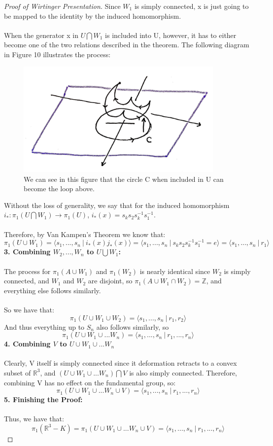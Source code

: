 \documentclass{article}
\begin{document}
\begin{proof}[Proof of Wirtinger Presentation]
Since $W_1$ is simply connected, x is just going to be mapped to the identity by the induced homomorphism.\\\\
When the generator x in $U \bigcap W_1$ is included into U, however, it has to either become one of the two relations described in the theorem. The following diagram in Figure 10 illustrates the process:
	\begin{figure}[h!]
		\centering
		\captionsetup{width=.75\linewidth}
		\includegraphics[width=4in]{figures/loop_above_plane.png}
		\caption{We can see in this figure that the circle C when included in U can become the loop above.}
		\label{fig:rtinstability}
	\end{figure}
Without the loss of generality, we say that for the induced homomorphism $i_*: \pi_1(U \bigcap W_1) \to \pi_1(U)$, $i_*(x) = s_ks_2s_k^{-1}s_1^{-1}$.\\\\
Therefore, by Van Kampen's Theorem we know that:
\[\pi_1(U \cup W_1) = \langle s_1, ..., s_n\ |\ i_*(x)j_*(x)\rangle = \langle s_1, ..., s_n\ |\ s_ks_2s_k^{-1}s_1^{-1} = e\rangle = \langle s_1, ..., s_n\ |\ r_1\rangle\]
{\bf 3. Combining $W_2, ..., W_n$ to $U \bigcup W_1$:}\\\\
The process for $\pi_1(A \cup W_1)$ and $\pi_1(W_2)$ is nearly identical since $W_2$ is simply connected, and $W_1$ and $W_2$ are disjoint, so $\pi_1(A \cup W_1 \cap W_2) = \mathbb{Z}$, and everything else follows similarly.\\\\
So we have that:
\[\pi_1(U \cup W_1 \cup W_2) = \langle s_1, ..., s_n\ |\ r_1, r_2\rangle\]
And thus everything up to $S_n$ also follows similarly, so
\[\pi_1(U \cup W_1 \cup ... W_n) = \langle s_1, ..., s_n\ |\ r_1, ..., r_n\rangle\]
{\bf 4. Combining $V$ to $U \cup W_1 \cup ... W_n$}\\\\
Clearly, V itself is simply connected since it deformation retracts to a convex subset of $\mathbb{R}^3$, and $(U \cup W_1 \cup ... W_n) \bigcap V$ is also simply connected. Therefore, combining V has no effect on the fundamental group, so:
\[\pi_1(U \cup W_1 \cup ... W_n \cup V) = \langle s_1, ..., s_n\ |\ r_1, ..., r_n\rangle\]
{\bf 5. Finishing the Proof:}\\\\
Thus, we have that:
\[\pi_1(\mathbb{R}^3 - K) = \pi_1(U \cup W_1 \cup ... W_n \cup V) = \langle s_1, ..., s_n\ |\ r_1, ..., r_n\rangle\]
\end{proof}
\end{document}
